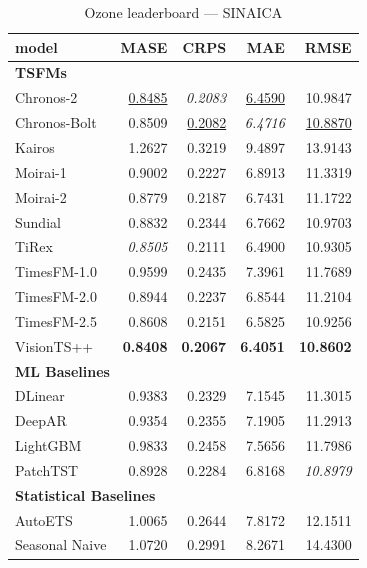 \begin{table}[H]
\caption{Ozone leaderboard --- SINAICA}
\centering
\begin{small}
\begin{tabular}{lrrrr}
\toprule
model & MASE & CRPS & MAE & RMSE \\
\midrule
\multicolumn{5}{l}{\textbf{TSFMs}} \\
Chronos-2 & \underline{0.8485} & \textit{0.2083} & \underline{6.4590} & 10.9847 \\
Chronos-Bolt & 0.8509 & \underline{0.2082} & \textit{6.4716} & \underline{10.8870} \\
Kairos & 1.2627 & 0.3219 & 9.4897 & 13.9143 \\
Moirai-1 & 0.9002 & 0.2227 & 6.8913 & 11.3319 \\
Moirai-2 & 0.8779 & 0.2187 & 6.7431 & 11.1722 \\
Sundial & 0.8832 & 0.2344 & 6.7662 & 10.9703 \\
TiRex & \textit{0.8505} & 0.2111 & 6.4900 & 10.9305 \\
TimesFM-1.0 & 0.9599 & 0.2435 & 7.3961 & 11.7689 \\
TimesFM-2.0 & 0.8944 & 0.2237 & 6.8544 & 11.2104 \\
TimesFM-2.5 & 0.8608 & 0.2151 & 6.5825 & 10.9256 \\
VisionTS++ & \textbf{0.8408} & \textbf{0.2067} & \textbf{6.4051} & \textbf{10.8602} \\
\midrule
\multicolumn{5}{l}{\textbf{ML Baselines}} \\
DLinear & 0.9383 & 0.2329 & 7.1545 & 11.3015 \\
DeepAR & 0.9354 & 0.2355 & 7.1905 & 11.2913 \\
LightGBM & 0.9833 & 0.2458 & 7.5656 & 11.7986 \\
PatchTST & 0.8928 & 0.2284 & 6.8168 & \textit{10.8979} \\
\midrule
\multicolumn{5}{l}{\textbf{Statistical Baselines}} \\
AutoETS & 1.0065 & 0.2644 & 7.8172 & 12.1511 \\
Seasonal Naive & 1.0720 & 0.2991 & 8.2671 & 14.4300 \\
\bottomrule
\end{tabular}
\end{small}
\end{table}